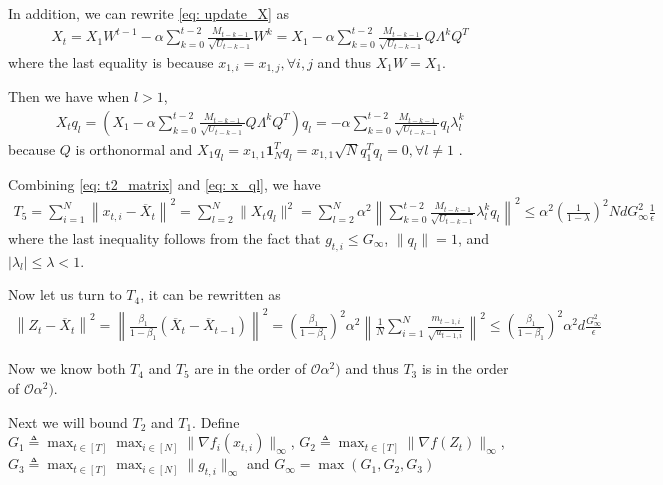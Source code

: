 \documentclass{article} %
\begin{document}
In addition, we can rewrite \eqref{eq: update_X} as 
\begin{align}\label{eq: update_x_decom}
X_t = X_{1} W^{t-1} -\alpha \sum_{k=0}^{t-2} \frac{M_{t-k-1}}{\sqrt{U_{t-k-1}}}  W^{k}   =  X_{1}  -\alpha \sum_{k=0}^{t-2} \frac{M_{t-k-1}}{\sqrt{U_{t-k-1}}} Q\Lambda^{k} Q^T 
\end{align}
where the last equality is because $x_{1,i} = x_{1,j}, \forall i,j $ and thus $X_1 W = X_1$.

Then we have when $l > 1$,
\begin{align}\label{eq: x_ql}
X_t q_l = (X_{1}  -\alpha \sum_{k=0}^{t-2} \frac{M_{t-k-1}}{\sqrt{U_{t-k-1}}} Q\Lambda^{k} Q^T ) q_l =  -\alpha \sum_{k=0}^{t-2} \frac{M_{t-k-1}}{\sqrt{U_{t-k-1}}} q_l \lambda_l^{k} 
\end{align}
because $Q$ is orthonormal and $X_1 q_l = x_{1,1} \mathbf 1_N^T q_l = x_{1,1} \sqrt{N} q_1^T q_l  = 0, \forall l \neq 1$ .

Combining \eqref{eq: t2_matrix} and \eqref{eq: x_ql}, we have
\begin{align} \label{eq: T_5_bound}
T_5 = 	\sum_{i=1}^N\left\| {  x_{t,i} -   \overline X_{t}}  \right\|^2  = \sum_{l=2}^N \|X_t q_l\|^2 =  \sum_{l=2}^N \alpha^2 \left \| \sum_{k=0}^{t-2} \frac{M_{t-k-1}}{\sqrt{U_{t-k-1}}} \lambda_{l}^{k}  q_l\right\|^2 \leq \alpha^2 \left (\frac{1}{1-\lambda} \right)^2 Nd G_{\infty}^2 \frac{1}{\epsilon}
\end{align}
where the last inequality follows from the fact that $g_{t,i} \leq G_{\infty}$, $\|q_l\| = 1$, and $|\lambda_l| \leq \lambda < 1$.


Now let us turn to $T_4$, it can be rewritten as 
\begin{align}
\left\|  Z_{t} -  \overline X_{t}\right\|^2  = \left\| \frac{\beta_1}{1-\beta_1} (\overline X_t - \overline X_{t-1}) \right \|^2  =\left( \frac{\beta_1}{1-\beta_1}\right)^2 \alpha^2 \left \|\frac{1}{N}\sum_{i=1}^N \frac{m_{t-1,i}}{\sqrt{u_{t-1,i}}}\right\|^2 \leq \left( \frac{\beta_1}{1-\beta_1}\right)^2 \alpha^2 d \frac{G_{\infty}^2}{\epsilon}
\end{align}

Now we know both $T_4$ and $T_5$ are in the order of  $\mathcal{O}\alpha^2)$ and thus $T_3$ is in the order of  $\mathcal{O}\alpha^2)$.


Next we will bound $T_2$ and $T_1$. Define  $G_1   \triangleq \max_{t \in [T]} \max_{i \in [N]} \|\nabla f_i(x_{t,i})\|_{\infty}$, $G_2   \triangleq \max_{t \in [T]}  \|\nabla f(Z_t)\|_{\infty}$, $G_3  \triangleq \max_{t \in [T]} \max_{i \in [N]} \|g_{t,i}\|_{\infty}$ and $G_{\infty} = \max(G_1,G_2,G_3)$       
\end{document}
